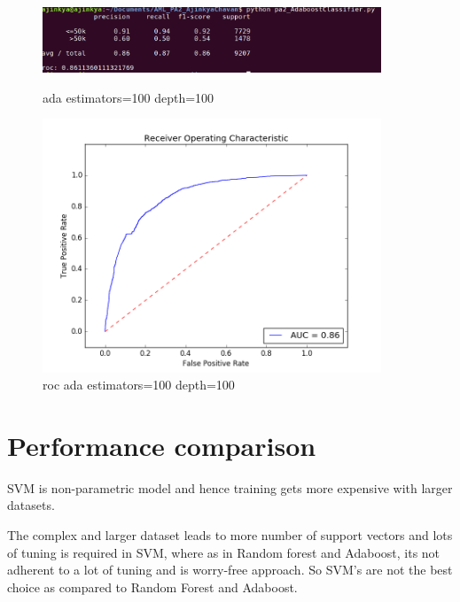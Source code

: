 \documentclass{article}
\begin{document}
\begin{figure}
    \centering
    \begin{minipage}{0.45\textwidth}
        \centering
        \includegraphics[width=0.9\textwidth]{ada_100_100.png} %
        \caption{ada estimators=100 depth=100}
    \end{minipage}\hfill
    \begin{minipage}{0.45\textwidth}
        \centering
        \includegraphics[width=0.9\textwidth]{roc_ada_100_100.png} %
        \caption{roc ada estimators=100 depth=100}
    \end{minipage}
\end{figure}


\pagebreak
    



\section{Performance comparison}

SVM is non-parametric model and hence training gets more expensive with larger datasets.

The complex and larger dataset leads to more number of support vectors and lots of tuning is required in SVM, where as in Random forest and Adaboost, its not adherent to a lot of tuning and is worry-free approach. So SVM's are not the best choice as compared to Random Forest and Adaboost.
\end{document}

